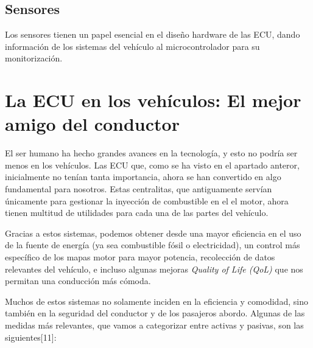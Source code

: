 \subsection{Sensores}

Los sensores tienen un papel esencial en el diseño hardware de las ECU, dando información de los sistemas del vehículo al microcontrolador para su monitorización. 


\section{La ECU en los vehículos: El mejor amigo del conductor}

El ser humano ha hecho grandes avances en la tecnología, y esto no podría ser menos en los vehículos. Las ECU que, como se ha visto en el apartado anteror, inicialmente no tenían tanta importancia, ahora se han convertido en algo fundamental para nosotros. Estas centralitas, que antiguamente servían únicamente para gestionar la inyección de combustible en el el motor, ahora tienen multitud de utilidades para cada una de las partes del vehículo.

Gracias a estos sistemas, podemos obtener desde una mayor eficiencia en el uso de la fuente de energía (ya sea combustible fósil o electricidad), un control más específico de los mapas motor para mayor potencia, recolección de datos relevantes del vehículo, e incluso algunas mejoras \textit{Quality of Life (QoL)} que nos permitan una conducción más cómoda. 

Muchos de estos sistemas no solamente inciden en la eficiencia y comodidad, sino también en la seguridad del conductor y de los pasajeros abordo. Algunas de las medidas más relevantes, que vamos a categorizar entre activas y pasivas, son las siguientes[11]:


